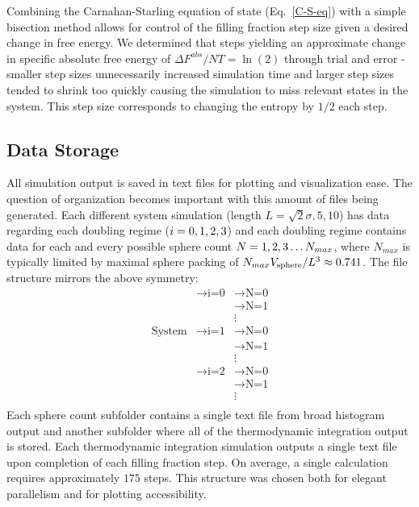 \documentclass[12pt]{article}
\newcommand{\ignore}[1]{}
\begin{document}
Combining the Carnahan-Starling equation of state (Eq.~\ref{C-S-eq}) with a simple bisection method allows for control of the filling fraction step size given a desired change in free energy. We determined that steps yielding an approximate change in specific absolute free energy of $\Delta F^{abs}/NT = \ln(2)$ through trial and error - smaller step sizes unnecessarily increased simulation time and larger step sizes tended to shrink too quickly causing the simulation to miss relevant states in the system. This step size corresponds to changing the entropy by $1/2$ each step. 

\ignore{NB: is there a more physical reason we chose this filling fraction increase?}

\subsection{Data Storage}
All simulation output is saved in text files for plotting and visualization ease. The question of organization becomes important with this amount of files being generated. Each different system simulation (length $L = \sqrt2 \sigma, 5,10$) has data regarding each doubling regime ($i=\nobreak 0,1, 2, 3$) and each doubling regime contains data for each and every possible sphere count $N=\nobreak 1, 2, 3\dots N_{max}$, where $N_{max}$ is typically limited by maximal sphere packing of $N_{max}V_{\text{sphere}}/L^3\approx\nobreak 0.741$. The file structure mirrors the above symmetry:
\begin{align*}
                &\rightarrow \text{i=0} &\rightarrow \text{N=0}\\
                & &\rightarrow \text{N=1}\\
                && \vdots\\
\text{System} & \rightarrow \text{i=1} &\rightarrow \text{N=0}\\
                && \rightarrow \text{N=1}\\
                &&\vdots\\
                &\rightarrow \text{i=2} &\rightarrow \text{N=0}\\
                && \rightarrow \text{N=1}\\
                &&\vdots\\
\end{align*}
Each sphere count subfolder contains a single text file from broad histogram output and another subfolder where all of the thermodynamic integration output is stored. Each thermodynamic integration simulation outputs a single text file upon completion of each filling fraction step. On average, a single calculation requires approximately $175$ steps. This structure was chosen both for elegant parallelism and for plotting accessibility. 
\end{document}
